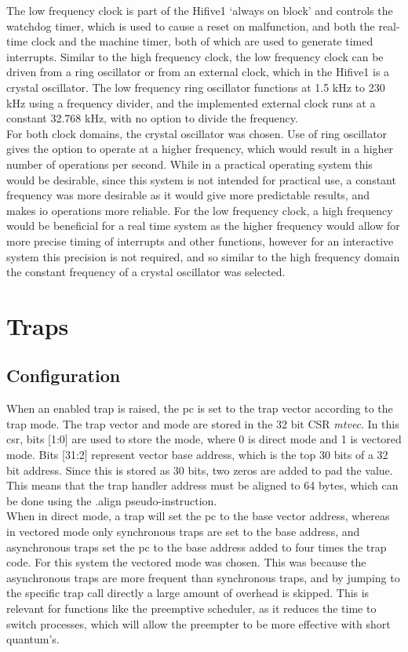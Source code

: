 The low frequency clock is part of the Hifive1 `always on block' and controls the watchdog timer, which is used to cause a reset on malfunction, and both the real-time clock and the machine timer, both of which are used to generate timed interrupts. Similar to the high frequency clock, the low frequency clock can be driven from a ring oscillator or from an external clock, which in the Hifive1 is a crystal oscillator. The low frequency ring oscillator functions at 1.5 kHz to 230 kHz using a frequency divider, and the implemented external clock runs at a constant 32.768 kHz, with no option to divide the frequency.
\\
For both clock domains, the crystal oscillator was chosen. Use of ring oscillator gives the option to operate at a higher frequency, which would result in a higher number of operations per second. While in a practical operating system this would be desirable, since this system is not intended for practical use, a constant frequency was more desirable as it would give more predictable results, and makes \ac{io} operations more reliable. For the low frequency clock, a high frequency would be beneficial for a real time system as the higher frequency would allow for more precise timing of interrupts and other functions, however for an interactive system this precision is not required, and so similar to the high frequency domain the constant frequency of a crystal oscillator was selected.
\section{Traps}
\subsection{Configuration}
When an enabled trap is raised, the pc is set to the trap vector according to the trap mode. The trap vector and mode are stored in the 32 bit CSR \textit{mtvec}. In this csr, bits [1:0] are used to store the mode, where 0 is direct mode and 1 is vectored mode. Bits [31:2] represent vector base address, which is the top 30 bits of a 32 bit address. Since this is stored as 30 bits, two zeros are added to pad the value. This means that the trap handler address must be aligned to 64 bytes, which can be done using the .align pseudo-instruction.\\
 When in direct mode, a trap will set the pc to the base vector address, whereas in vectored mode only synchronous traps are set to the base address, and asynchronous traps set the pc to the base address added to four times the trap code. For this system the vectored mode was chosen. This was because the asynchronous traps are more frequent than synchronous traps, and by jumping to the specific trap call directly a large amount of overhead is skipped. This is relevant for functions like the preemptive scheduler, as it reduces the time to switch processes, which will allow the preempter to be more effective with short quantum's.
